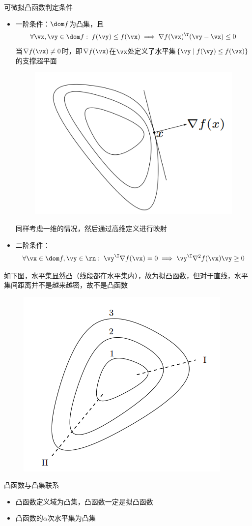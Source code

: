 \begin{theorem}
	可微拟凸函数判定条件
	\begin{itemize}
		\item 一阶条件：$\dom f$为凸集，且
		\[\forall \vx,\vy\in\dom f:\;f(\vy)\leq f(\vx)\implies\nabla f(\vx)^\T(\vy-\vx)\leq 0\]
		当$\nabla f(\vx)\ne 0$时，即$\nabla f(\vx)$在$\vx$处定义了水平集$\{\vy\mid f(\vy)\leq f(\vx)\}$的支撑超平面
		\begin{figure}[H]
			\centering
			\includegraphics[width=0.4\linewidth]{fig/support-plane.PNG}
		\end{figure}
		\begin{analysis}
			同样考虑一维的情况，然后通过高维定义进行映射
		\end{analysis}
		\item 二阶条件：
		\[\forall \vx\in\dom f,\vy\in\rn:\;\vy^\T\nabla f(\vx)=0\implies \vy^\T\nabla^2f(\vx)\vy\geq 0\]
	\end{itemize}
\end{theorem}

\begin{example}[(拟)凸函数的判定]
	如下图，水平集显然凸（线段都在水平集内），故为拟凸函数，但对于直线\uppercase\expandafter{}，水平集间距离并不是越来越密，故不是凸函数
	\begin{figure}[H]
		\centering
		\includegraphics[width=0.35\linewidth]{fig/example-convex-function.PNG}
	\end{figure}
\end{example}

凸函数与凸集联系
\begin{itemize}
	\item 凸函数定义域为凸集，凸函数一定是拟凸函数
	\item 凸函数的$\alpha$次水平集为凸集
\end{itemize}